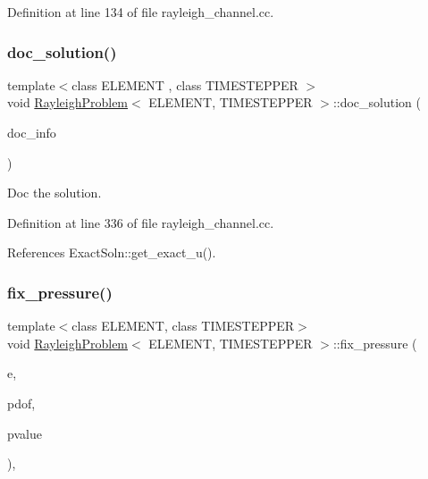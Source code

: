 Definition at line 134 of file rayleigh\+\_\+channel.\+cc.

\mbox{\label{classRayleighProblem_aca1b0f4134bc745c75ae524450e97109}} 
\subsubsection{\texorpdfstring{doc\+\_\+solution()}{doc\_solution()}}
{\footnotesize\ttfamily template$<$class E\+L\+E\+M\+E\+NT , class T\+I\+M\+E\+S\+T\+E\+P\+P\+ER $>$ \\
void \hyperlink{classRayleighProblem}{Rayleigh\+Problem}$<$ E\+L\+E\+M\+E\+NT, T\+I\+M\+E\+S\+T\+E\+P\+P\+ER $>$\+::doc\+\_\+solution (\begin{DoxyParamCaption}\item[{Doc\+Info \&}]{doc\+\_\+info }\end{DoxyParamCaption})}



Doc the solution. 



Definition at line 336 of file rayleigh\+\_\+channel.\+cc.



References Exact\+Soln\+::get\+\_\+exact\+\_\+u().

\mbox{\label{classRayleighProblem_ab977f10be3d0cb8f885bff340b64e4ce}} 
\subsubsection{\texorpdfstring{fix\+\_\+pressure()}{fix\_pressure()}}
{\footnotesize\ttfamily template$<$class E\+L\+E\+M\+E\+NT, class T\+I\+M\+E\+S\+T\+E\+P\+P\+ER$>$ \\
void \hyperlink{classRayleighProblem}{Rayleigh\+Problem}$<$ E\+L\+E\+M\+E\+NT, T\+I\+M\+E\+S\+T\+E\+P\+P\+ER $>$\+::fix\+\_\+pressure (\begin{DoxyParamCaption}\item[{const unsigned \&}]{e,  }\item[{const unsigned \&}]{pdof,  }\item[{const double \&}]{pvalue }\end{DoxyParamCaption})\hspace{0.3cm}{\ttfamily [inline]}, {\ttfamily [private]}}



